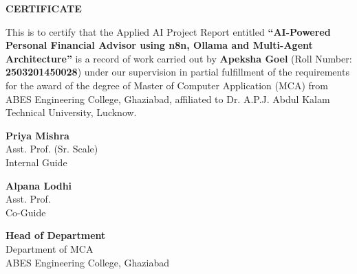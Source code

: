 \documentclass[12pt,a4paper]{report}
\begin{document}
\setcounter{page}{1}

\newpage
\begin{center}
    \Large\textbf{CERTIFICATE}\\
    \vspace{1.0cm}
\end{center}
\onehalfspacing
This is to certify that the Applied AI Project Report entitled \textbf{``AI-Powered Personal Financial Advisor using n8n, Ollama and Multi-Agent Architecture''} is a record of work carried out by \textbf{Apeksha Goel} (Roll Number: \textbf{2503201450028}) under our supervision in partial fulfillment of the requirements for the award of the degree of Master of Computer Application (MCA) from ABES Engineering College, Ghaziabad, affiliated to Dr. A.P.J. Abdul Kalam Technical University, Lucknow.
\vspace{1.5cm}

\noindent
\begin{minipage}[t]{0.45\textwidth}
    \centering
    \textbf{Priya Mishra}\\
    Asst. Prof. (Sr. Scale)\\
    Internal Guide
\end{minipage}
\hfill
\begin{minipage}[t]{0.45\textwidth}
    \centering
    \textbf{Alpana Lodhi}\\
    Asst. Prof.\\
    Co-Guide
\end{minipage}

\vspace{1.5cm}
\noindent
\begin{minipage}[t]{1.0\textwidth}
    \centering
    \textbf{Head of Department}\\
    Department of MCA\\
    ABES Engineering College, Ghaziabad
\end{minipage}


\clearpage
{}
\setcounter{page}{1}







\end{document}
